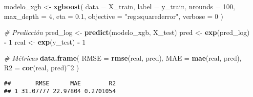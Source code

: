 \documentclass[
]{article}
\newenvironment{Shaded}{\begin{snugshade}}{\end{snugshade}}
\newcommand{\AttributeTok}[1]{\textcolor[rgb]{0.13,0.29,0.53}{#1}}
\newcommand{\CommentTok}[1]{\textcolor[rgb]{0.56,0.35,0.01}{\textit{#1}}}
\newcommand{\DecValTok}[1]{\textcolor[rgb]{0.00,0.00,0.81}{#1}}
\newcommand{\FloatTok}[1]{\textcolor[rgb]{0.00,0.00,0.81}{#1}}
\newcommand{\FunctionTok}[1]{\textcolor[rgb]{0.13,0.29,0.53}{\textbf{#1}}}
\newcommand{\NormalTok}[1]{#1}
\newcommand{\OtherTok}[1]{\textcolor[rgb]{0.56,0.35,0.01}{#1}}
\newcommand{\SpecialCharTok}[1]{\textcolor[rgb]{0.81,0.36,0.00}{\textbf{#1}}}
\newcommand{\StringTok}[1]{\textcolor[rgb]{0.31,0.60,0.02}{#1}}
\begin{document}
\begin{Shaded}
\begin{Highlighting}[]
\NormalTok{modelo\_xgb }\OtherTok{\textless{}{-}} \FunctionTok{xgboost}\NormalTok{(}
  \AttributeTok{data =}\NormalTok{ X\_train,}
  \AttributeTok{label =}\NormalTok{ y\_train,}
  \AttributeTok{nrounds =} \DecValTok{100}\NormalTok{,}
  \AttributeTok{max\_depth =} \DecValTok{4}\NormalTok{,}
  \AttributeTok{eta =} \FloatTok{0.1}\NormalTok{,}
  \AttributeTok{objective =} \StringTok{"reg:squarederror"}\NormalTok{,}
  \AttributeTok{verbose =} \DecValTok{0}
\NormalTok{)}

\CommentTok{\# Predicción}
\NormalTok{pred\_log }\OtherTok{\textless{}{-}} \FunctionTok{predict}\NormalTok{(modelo\_xgb, X\_test)}
\NormalTok{pred }\OtherTok{\textless{}{-}} \FunctionTok{exp}\NormalTok{(pred\_log) }\SpecialCharTok{{-}} \DecValTok{1}
\NormalTok{real }\OtherTok{\textless{}{-}} \FunctionTok{exp}\NormalTok{(y\_test) }\SpecialCharTok{{-}} \DecValTok{1}

\CommentTok{\# Métricas}
\FunctionTok{data.frame}\NormalTok{(}
  \AttributeTok{RMSE =} \FunctionTok{rmse}\NormalTok{(real, pred),}
  \AttributeTok{MAE =} \FunctionTok{mae}\NormalTok{(real, pred),}
  \AttributeTok{R2 =} \FunctionTok{cor}\NormalTok{(real, pred)}\SpecialCharTok{\^{}}\DecValTok{2}
\NormalTok{)}
\end{Highlighting}
\end{Shaded}

\begin{verbatim}
##       RMSE      MAE        R2
## 1 31.07777 22.97804 0.2701054
\end{verbatim}
\end{document}
